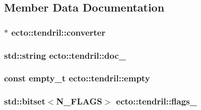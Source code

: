 \subsection{\-Member \-Data \-Documentation}
\hypertarget{classecto_1_1tendril_ac4d6bcc7c0f82c7017a9e0c53a942121}{
\subsubsection[{converter}]{$\ast$ {\bf ecto\-::tendril\-::converter}}}\label{classecto_1_1tendril_ac4d6bcc7c0f82c7017a9e0c53a942121}
\hypertarget{classecto_1_1tendril_a6e8304d03aa8a24be843d3bb8d26332d}{
\subsubsection[{doc\-\_\-}]{\setlength{\rightskip}{0pt plus 5cm}std\-::string {\bf ecto\-::tendril\-::doc\-\_\-}}}\label{classecto_1_1tendril_a6e8304d03aa8a24be843d3bb8d26332d}
\hypertarget{classecto_1_1tendril_ab8098c05197f972a821c8b094b9a6010}{
\subsubsection[{empty}]{\setlength{\rightskip}{0pt plus 5cm}const {\bf empty\-\_\-t} {\bf ecto\-::tendril\-::empty}}}\label{classecto_1_1tendril_ab8098c05197f972a821c8b094b9a6010}
\hypertarget{classecto_1_1tendril_a7b2a11ba7c80606fafda80d34b0a1bfe}{
\subsubsection[{flags\-\_\-}]{\setlength{\rightskip}{0pt plus 5cm}std\-::bitset$<${\bf \-N\-\_\-\-F\-L\-A\-G\-S}$>$ {\bf ecto\-::tendril\-::flags\-\_\-}}}\label{classecto_1_1tendril_a7b2a11ba7c80606fafda80d34b0a1bfe}

